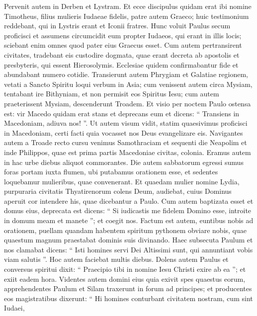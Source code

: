 \begin{biblechapter}
\begin{biblechapter}
\begin{biblechapter}
\begin{biblechapter}
\begin{biblechapter}
\begin{biblechapter}
\begin{biblechapter}
\begin{biblechapter}
\begin{biblechapter}
\begin{biblechapter}
\begin{biblechapter}
\begin{biblechapter}
\begin{biblechapter}
\begin{biblechapter}
\begin{biblechapter}
\begin{biblechapter}
\verse Pervenit autem in Derben et Lystram. Et ecce discipulus quidam erat ibi nomine Timotheus, filius mulieris Iudaeae fidelis, patre autem Graeco; 
\verse huic testimonium reddebant, qui in Lystris erant et Iconii fratres. 
\verse Hunc voluit Paulus secum proficisci et assumens circumcidit eum propter Iudaeos, qui erant in illis locis; sciebant enim omnes quod pater eius Graecus esset. 
\verse Cum autem pertransirent civitates, tradebant eis custodire dogmata, quae erant decreta ab apostolis et presbyteris, qui essent Hierosolymis. 
\verse Ecclesiae quidem confirmabantur fide et abundabant numero cotidie.
 \verse Transierunt autem Phrygiam et Galatiae regionem, vetati a Sancto Spiritu loqui verbum in Asia; 
\verse cum venissent autem circa Mysiam, tentabant ire Bithyniam, et non permisit eos Spiritus Iesu; 
\verse cum autem praeterissent Mysiam, descenderunt Troadem. 
\verse Et visio per noctem Paulo ostensa est: vir Macedo quidam erat stans et deprecans eum et dicens: “ Transiens in Macedoniam, adiuva nos! ”. 
\verse Ut autem visum vidit, statim quaesivimus proficisci in Macedoniam, certi facti quia vocasset nos Deus evangelizare eis.
 \verse Navigantes autem a Troade recto cursu venimus Samothraciam et sequenti die Neapolim 
\verse et inde Philippos, quae est prima partis Macedoniae civitas, colonia. Eramus autem in hac urbe diebus aliquot commorantes. 
\verse Die autem sabbatorum egressi sumus foras portam iuxta flumen, ubi putabamus orationem esse, et sedentes loquebamur mulieribus, quae convenerant. 
\verse Et quaedam mulier nomine Lydia, purpuraria civitatis Thyatirenorum colens Deum, audiebat, cuius Dominus aperuit cor intendere his, quae dicebantur a Paulo. 
\verse Cum autem baptizata esset et domus eius, deprecata est dicens: “ Si iudicastis me fidelem Domino esse, introite in domum meam et manete ”; et coegit nos.
 \verse Factum est autem, euntibus nobis ad orationem, puellam quandam habentem spiritum pythonem obviare nobis, quae quaestum magnum praestabat dominis suis divinando. 
\verse Haec subsecuta Paulum et nos clamabat dicens: “ Isti homines servi Dei Altissimi sunt, qui annuntiant vobis viam salutis ”. 
\verse Hoc autem faciebat multis diebus. Dolens autem Paulus et conversus spiritui dixit: “ Praecipio tibi in nomine Iesu Christi exire ab ea ”; et exiit eadem hora. 
\verse Videntes autem domini eius quia exivit spes quaestus eorum, apprehendentes Paulum et Silam traxerunt in forum ad principes; 
\verse et producentes eos magistratibus dixerunt: “ Hi homines conturbant civitatem nostram, cum sint Iudaei, 

\end{biblechapter}
\end{biblechapter}
\end{biblechapter}
\end{biblechapter}
\end{biblechapter}
\end{biblechapter}
\end{biblechapter}
\end{biblechapter}
\end{biblechapter}
\end{biblechapter}
\end{biblechapter}
\end{biblechapter}
\end{biblechapter}
\end{biblechapter}
\end{biblechapter}
\end{biblechapter}
